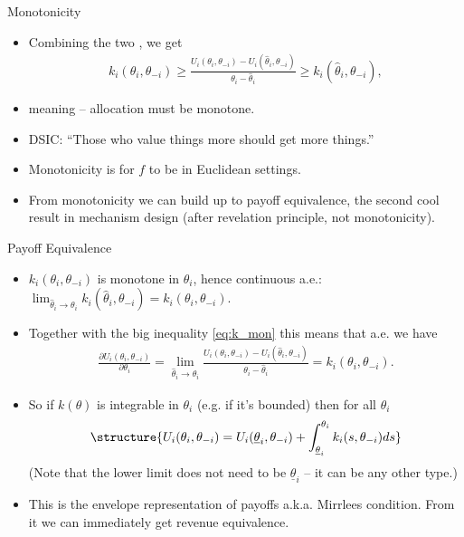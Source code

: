 \documentclass[english,10pt
,aspectratio=169
]{beamer}
\begin{document}
\begin{frame}{Monotonicity}
\begin{itemize}
	\item Combining the two , we get
	{\small \vspace{-0.5em}\begin{align}
		\label{eq:k_mon}
			k_i(\theta_i,\theta_{-i}) 
			\geq 
			\frac{ U_i(\theta_i, \theta_{-i}) - U_i(\hat{\theta}_i, \theta_{-i}) }{ \theta_i - \hat{\theta}_i } 
			\geq 
			k_i(\hat{\theta}_i,\theta_{-i}),
		\end{align}\vspace{-1em}}
	\pause
	\item meaning  -- allocation must be \alert{monotone}.
	\item DSIC: ``Those who value things more should get more things.''
	\item \alert{Monotonicity} is  for $f$ to be  in \alert{Euclidean} settings.
	\item From monotonicity we can build up to \alert{payoff equivalence}, 
	the second cool result in mechanism design (after revelation principle, not monotonicity).
\end{itemize}
\end{frame}


\begin{frame}{Payoff Equivalence}
\begin{itemize}
	\item $k_i(\theta_i,\theta_{-i})$ is monotone in $\theta_i$, hence continuous a.e.: $\lim_{\hat{\theta}_i \to \theta_i} k_i(\hat{\theta}_i,\theta_{-i}) = k_i(\theta_i,\theta_{-i})$.
	\pause
	\item Together with the big inequality \eqref{eq:k_mon}	this means that a.e. we have
	\pause
	\begin{align*}
		\frac{\partial U_i(\theta_i,\theta_{-i})}{\partial \theta_i} = \lim_{\hat{\theta}_i \to \theta_i} \frac{ U_i(\theta_i, \theta_{-i}) - U_i(\hat{\theta}_i, \theta_{-i}) }{ \theta_i - \hat{\theta}_i }  = k_i(\theta_i,\theta_{-i}).
	\end{align*}
	\pause
	\item So if $k(\theta)$ is integrable in $\theta_i$ (e.g. if it's bounded) then for all $\theta_i$
	\begin{align*}
	\structure{
		U_i(\theta_i, \theta_{-i}) = U_i (\underline{\theta}_i,\theta_{-i}) + \int_{\underline{\theta}_i}^{\theta_i} k_i(s,\theta_{-i}) d s
	}
	\end{align*}
	(Note that the lower limit does not need to be $\underline{\theta}_i$ -- it can be any other type.)
	\item This is the \alert{envelope representation of payoffs} a.k.a. Mirrlees condition. From it we can immediately get revenue equivalence.
\end{itemize}
\end{frame}
\end{document}
